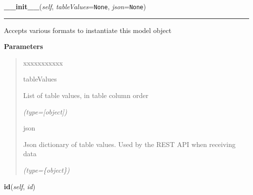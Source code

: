     \vspace{0.5ex}

\hspace{.8\funcindent}\begin{boxedminipage}{\funcwidth}

    \raggedright \textbf{\_\_init\_\_}(\textit{self}, \textit{tableValues}={\tt None}, \textit{json}={\tt None})

    \vspace{-1.5ex}

    \rule{\textwidth}{0.5\fboxrule}
\setlength{\parskip}{2ex}
    Accepts various formats to instantiate this model object

\setlength{\parskip}{1ex}
      \textbf{Parameters}
      \vspace{-1ex}

      \begin{quote}
        \begin{Ventry}{xxxxxxxxxxx}

          \item[tableValues]

          List of table values, in table column order

            {\it (type=[object])}

          \item[json]

          Json dictionary of table values. Used by the REST API when 
          receiving data

            {\it (type=\{object\})}

        \end{Ventry}

      \end{quote}

    \end{boxedminipage}

    \label{src:dao:model:manual_cropped:manual_cropped:id}

    \vspace{0.5ex}

\hspace{.8\funcindent}\begin{boxedminipage}{\funcwidth}

    \raggedright \textbf{id}(\textit{self}, \textit{id})

\setlength{\parskip}{2ex}
\setlength{\parskip}{1ex}
    \end{boxedminipage}

